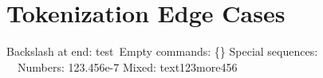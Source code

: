 \documentclass{article}
\begin{document}
\section{Tokenization Edge Cases}
Backslash at end: test\
Empty commands: \{\}
Special sequences: \\ \, \; \: \! \  
Numbers: 123.456e-7
Mixed: text123more456
\end{document}
